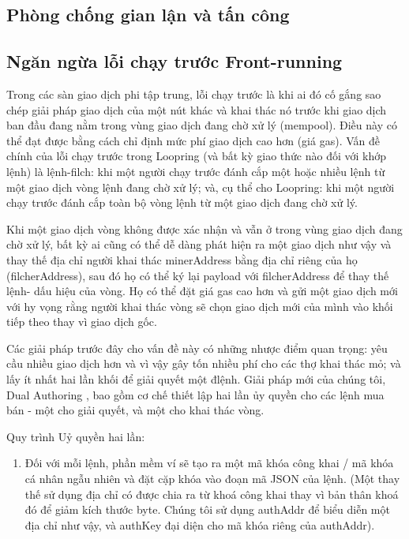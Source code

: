 \documentclass[12pt,a4paper]{article}
\begin{document}
\begin{multicols}{2}
\section{Phòng chống gian lận và tấn công}

\subsection{Ngăn ngừa lỗi chạy trước Front-running \label{sec:dual_authoring}}
Trong các sàn giao dịch phi tập trung, lỗi chạy trước là khi ai đó cố gắng sao chép giải pháp giao dịch của một nút khác và khai thác nó trước khi giao dịch ban đầu đang nằm trong vùng giao dịch đang chờ xử lý (mempool). Điều này có thể đạt được bằng cách chỉ định mức phí giao dịch cao hơn (giá gas). Vấn đề chính của lỗi chạy trước trong Loopring (và bất kỳ giao thức nào đối với khớp lệnh) là lệnh-filch: khi một người chạy trước đánh cắp một hoặc nhiều lệnh từ một giao dịch vòng lệnh đang chờ xử lý; và, cụ thể cho Loopring: khi một người chạy trước đánh cắp toàn bộ vòng lệnh từ một giao dịch đang chờ xử lý.

Khi một giao dịch vòng không được xác nhận và vẫn ở trong vùng giao dịch đang chờ xử lý, bất kỳ ai cũng có thể dễ dàng phát hiện ra một giao dịch như vậy và thay thế địa chỉ người khai thác minerAddress bằng địa chỉ riêng của họ (filcherAddress), sau đó họ có thể ký lại payload với filcherAddress để thay thế lệnh- dấu hiệu của vòng. Họ có thể đặt giá gas cao hơn và gửi một giao dịch mới với hy vọng rằng người khai thác vòng sẽ chọn giao dịch mới của mình vào khối tiếp theo thay vì giao dịch gốc.

Các giải pháp trước đây cho vấn đề này có những nhược điểm quan trọng: yêu cầu nhiều giao dịch hơn và vì vậy gây tốn nhiều phí cho các thợ khai thác mỏ; và lấy ít nhất hai lần khối để giải quyết một đlệnh. Giải pháp mới của chúng tôi, Dual Authoring \cite{dualauthor}, bao gồm cơ chế thiết lập hai lần ủy quyền cho các lệnh mua bán - một cho giải quyết, và một cho khai thác vòng.

Quy trình Uỷ quyền hai lần:
\begin{enumerate}

  \item Đối với mỗi lệnh, phần mềm ví sẽ tạo ra một mã khóa công khai / mã khóa cá nhân ngẫu nhiên và đặt cặp khóa vào đoạn mã JSON của lệnh. (Một thay thế sử dụng địa chỉ có được chia ra từ khoá công khai thay vì bản thân khoá đó để giảm kích thước byte. Chúng tôi sử dụng authAddr để biểu diễn một địa chỉ như vậy, và authKey đại diện cho mã khóa riêng của authAddr).


\end{enumerate}
\end{multicols}
\end{document}
